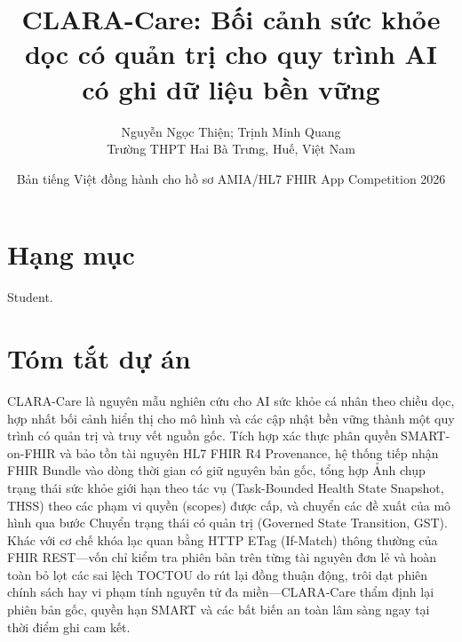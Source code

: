 \documentclass[10pt]{article}
\title{\textbf{CLARA-Care: Bối cảnh sức khỏe dọc có quản trị cho quy trình AI có ghi dữ liệu bền vững}}
\author{Nguyễn Ngọc Thiện; Trịnh Minh Quang \\ Trường THPT Hai Bà Trưng, Huế, Việt Nam}
\date{Bản tiếng Việt đồng hành cho hồ sơ AMIA/HL7 FHIR App Competition 2026}
\begin{document}
\maketitle

\section{Hạng mục}
Student.

\section{Tóm tắt dự án}
CLARA-Care là nguyên mẫu nghiên cứu cho AI sức khỏe cá nhân theo chiều dọc, hợp nhất bối cảnh hiển thị cho mô hình và các cập nhật bền vững thành một quy trình có quản trị và truy vết nguồn gốc. Tích hợp xác thực phân quyền SMART-on-FHIR và bảo tồn tài nguyên HL7 FHIR R4 Provenance, hệ thống tiếp nhận FHIR Bundle vào dòng thời gian có giữ nguyên bản gốc, tổng hợp Ảnh chụp trạng thái sức khỏe giới hạn theo tác vụ (Task-Bounded Health State Snapshot, THSS) theo các phạm vi quyền (scopes) được cấp, và chuyển các đề xuất của mô hình qua bước Chuyển trạng thái có quản trị (Governed State Transition, GST). Khác với cơ chế khóa lạc quan bằng HTTP ETag (If-Match) thông thường của FHIR REST---vốn chỉ kiểm tra phiên bản trên từng tài nguyên đơn lẻ và hoàn toàn bỏ lọt các sai lệch TOCTOU do rút lại đồng thuận động, trôi dạt phiên chính sách hay vi phạm tính nguyên tử đa miền---CLARA-Care thẩm định lại phiên bản gốc, quyền hạn SMART và các bất biến an toàn lâm sàng ngay tại thời điểm ghi cam kết.
\end{document}
